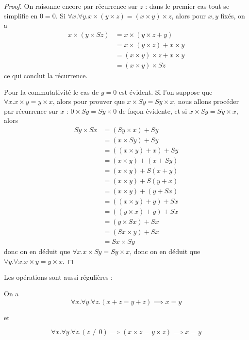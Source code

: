 \begin{proof}
    On raisonne encore par récurrence sur $z$ : dans le premier cas tout se simplifie en $0=0$. Si $\forall x.\forall y.x\times (y\times z)=(x\times y)\times z$, alors pour $x,y$ fixés, on a \begin{align*}
        x\times (y\times Sz) &= x\times (y \times z + y)\\
        &= x\times (y\times z) + x\times y\\
        &= (x\times y)\times z + x\times y\\
        &= (x\times y)\times Sz
    \end{align*}
    ce qui conclut la récurrence.

    Pour la commutativité le cas de $y=0$ est évident. Si l'on suppose que $\forall x.x\times y=y\times x$, alors pour prouver que $x\times Sy = Sy\times x$, nous allons procéder par récurrence sur $x$ : $0\times Sy = Sy\times 0$ de façon évidente, et si $x\times Sy = Sy\times x$, alors \begin{align*}
        Sy\times Sx &= (Sy\times x) + Sy\\
        &= (x\times Sy) + Sy\\
        &= ((x\times y) + x) + Sy\\
        &= (x\times y) + (x+Sy)\\
        &= (x\times y) + S(x+y)\\
        &= (x\times y) + S(y+x)\\
        &= (x\times y) + (y+Sx)\\
        &= ((x\times y) + y) + Sx\\
        &= ((y\times x) + y) + Sx\\
        &= (y\times Sx) + Sx\\
        &= (Sx \times y) + Sx\\
        &= Sx\times Sy
    \end{align*}
    donc on en déduit que $\forall x. x\times Sy=Sy\times x$, donc on en déduit que $\forall y.\forall x. x\times y = y\times x$.
\end{proof}

Les opérations sont aussi régulières :

\begin{prop}[Régularité]
    On a $$\forall x.\forall y.\forall z. (x+z = y+z) \implies x=y$$ \begin{center} et \end{center} $$\forall x.\forall y.\forall z. (z\neq 0) \implies (x\times z = y\times z)\implies x=y$$
\end{prop}

